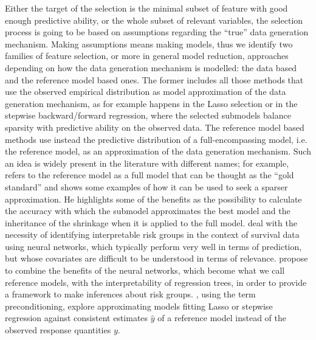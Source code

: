 \documentclass[american,]{article}
\theoremstyle{definition}
\begin{document}
Either the target of the selection is the minimal subset of feature with good enough predictive ability, or the whole subset of relevant variables, the selection process is going to be based on assumptions regarding the ``true'' data generation mechanism. Making assumptions means making models, thus we identify two families of feature selection, or more in general model reduction, approaches depending on how the data generation mechanism is modelled: the data based and the reference model based ones. The former includes all those methods that use the observed empirical distribution as model approximation of the data generation mechanism, as for example happens in the Lasso selection \cite{tibshirani1996regression} or in the stepwise backward/forward regression, where the selected submodels balance sparsity with predictive ability on the observed data. The reference model based methods use instead the predictive distribution of a full-encompassing model, i.e. the reference model, as an approximation of the data generation mechanism. Such an idea is widely present in the literature with different names; for example, \cite{harrell2015regression} refers to the reference model as a full model that can be thought as the ``gold standard'' and shows some examples of how it can be used to seek a sparser approximation. He highlights some of the benefits as the possibility to calculate the accuracy with which the submodel approximates the best model and the inheritance of the shrinkage when it is applied to the full model. \cite{faraggi2001understanding} deal with the necessity of identifying interpretable risk groups in the context of survival data using neural networks, which typically perform very well in terms of prediction, but whose covariates are difficult to be understood in terms of relevance. \cite{faraggi2001understanding} propose to combine the benefits of the neural networks, which become what we call reference models, with the interpretability of regression trees, in order to provide a framework to make inferences about risk groups. \cite{paul2008preconditioning}, using the term preconditioning, explore approximating models fitting Lasso or stepwise regression against consistent estimates $\hat{y}$ of a reference model instead of the observed response quantities $y$. 
\\
\end{document}
